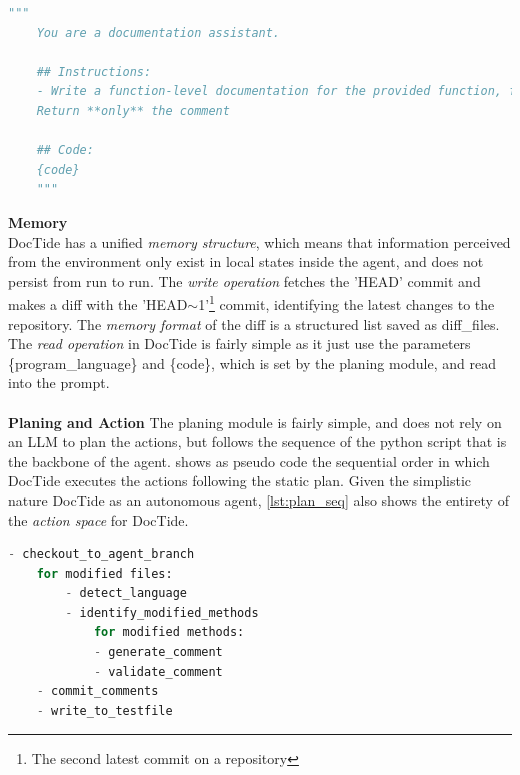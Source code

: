 \begin{lstlisting}[language=Python, label={lst:prompt}, caption=Prompt used for the LLM]
    """
    You are a documentation assistant.

    ## Instructions:
    - Write a function-level documentation for the provided function, following best documentation practice for {program_language}
    Return **only** the comment

    ## Code:
    {code}
    """
\end{lstlisting}
\textbf{Memory}
\\
DocTide has a unified \textit{memory structure}, which means that information perceived from the environment only exist in local states inside the agent, and does not persist from run to run. The \textit{write operation} fetches the 'HEAD' commit and makes a diff with the 'HEAD\(\sim \)1'\footnote{The second latest commit on a repository} commit, identifying the latest changes to the repository. The \textit{memory format} of the diff is a structured list saved as diff\_files. The \textit{read operation} in DocTide is fairly simple as it just use the parameters \{program\_language\} and \{code\}, which is set by the planing module, and read into the prompt.
\\ \\
\textbf{Planing and Action}
\label{sec:planning module}
The planing module is fairly simple, and does not rely on an LLM to plan the actions, but follows the sequence of the python script that is the backbone of the agent.  shows as pseudo code the sequential order in which DocTide executes the actions following the static plan. Given the simplistic nature DocTide as an autonomous agent, \ref{lst:plan_seq} also shows the entirety of the \textit{action space} for DocTide.

\begin{lstlisting}[language=Python, label={lst:plan_seq}, caption=The plan sequence of DocTides actions]
    - checkout_to_agent_branch
    for modified files:
        - detect_language
        - identify_modified_methods
            for modified methods:
            - generate_comment
            - validate_comment
    - commit_comments
    - write_to_testfile
\end{lstlisting}


